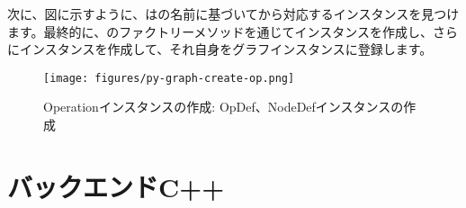 \begin{content}
次に、図に示すように、はの名前に基づいてから対応するインスタンスを見つけます。最終的に、のファクトリーメソッドを通じてインスタンスを作成し、さらにインスタンスを作成して、それ自身をグラフインスタンスに登録します。

\begin{figure}[H]
\centering
\texttt{[image: figures/py-graph-create-op.png]}
\caption{Operationインスタンスの作成: OpDef、NodeDefインスタンスの作成}
 \label{fig:py-graph-create-op}
\end{figure}

\end{content}

\section{バックエンドC++}

